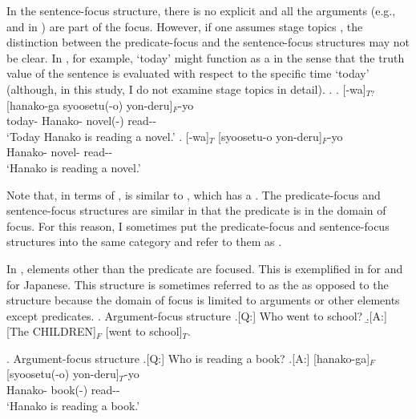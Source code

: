 In the sentence-focus structure,
there is no explicit  and all the arguments (e.g.,  and  in \Last[A]) are part of the focus.
However, if one assumes stage topics \cite{erteschik-shir97,erteschik-shir07},
the distinction between the predicate-focus and the sentence-focus structures may not be clear.
In \Next[a], for example,
 `today' might function as a  in the sense that
the truth value of the sentence is evaluated with respect to the specific time `today' (although, in this study, I do not examine stage topics in detail).
\ex. 
	\ag. [-wa]$_{T?}$ [hanako-ga syoosetu(-o) yon-deru]$_{F}$-yo \\
		today- Hanako- novel(-) read-- \\
		`Today Hanako is reading a novel.'
		\bg. [-wa]$_{T}$ [syoosetu-o yon-deru]$_{F}$-yo \\
		Hanako- novel- read-- \\
		`Hanako is reading a novel.'

Note that, in terms of ,
\Last[a] is similar to \Last[b],
which has a .
The predicate-focus and sentence-focus structures are similar
in that the predicate is in the domain of focus.
For this reason, I sometimes put the predicate-focus and sentence-focus structures into the same category
and refer to them as .

In ,
elements other than the predicate are focused.
This is exemplified in \Next[A] for 
and \NNext[A] for Japanese.
This structure is sometimes referred to as the 
as opposed to the  structure
because the domain of focus is limited to arguments or other elements except predicates.
\ex. Argument-focus structure
	\a.[Q:] Who went to school?
	\b.[A:] [The CHILDREN]$_{F}$ [went to school]$_{T}$. \hfill{\cite[][p.\ 121]{lambrecht94}}

\ex. Argument-focus structure
	\a.[Q:] Who is reading a book?
	\bg.[A:] [hanako-ga]$_{F}$ [syoosetu(-o) yon-deru]$_{T}$-yo \\
		Hanako- book(-) read-- \\
		`Hanako is reading a book.'

